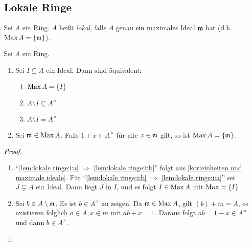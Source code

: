 \documentclass[12pt,a4paper]{scrartcl}
\theoremstyle{cplain}
\theoremstyle{cdef}
\begin{document}
\subsection{Lokale Ringe}
\begin{defi} \label{def1.5}
	Sei $A$ ein Ring. $A$ heißt \emph{lokal}, falls $A$ genau ein maximales Ideal $\mathfrak{m}$ hat (d.h. $\operatorname{Max} A = \{\mathfrak{m}\}$).
\end{defi}
\begin{lem} \label{lem:lokale ringe}
	Sei $A$ ein Ring.
	\begin{enumerate}
		\item \label{lem:lokale ringe:i} Sei $I \subsetneq A$ ein Ideal. Dann sind äquivalent:
		      \begin{enumerate}
			      \item $\operatorname{Max} A = \{I\}$ \label{lem:lokale ringe:i:a}
			      \item $A \setminus I \subseteq A^{\times}$ \label{lem:lokale ringe:i:b}
			      \item $A \setminus I = A^{\times}$ \label{lem:lokale ringe:i:c}
		      \end{enumerate}
		\item \label{lem:lokale ringe:ii} Sei $\mathfrak{m} \in \operatorname{Max} A$. Falls $1+x \in A^{\times}$ für alle $x \in \mathfrak{m}$ gilt, so ist $\operatorname{Max} A=\{ \mathfrak{m} \}$.
	\end{enumerate}
    \begin{proof}
        \leavevmode
		\begin{enumerate}[label=\ref{lem:lokale ringe:\roman*}]
			\item \enquote{\ref{lem:lokale ringe:i:a} $\Rightarrow$ \ref{lem:lokale ringe:i:b}} folgt aus \cref{kor:einheiten und maximale ideale}. Für \enquote{\ref{lem:lokale ringe:i:b} $\Rightarrow$ \ref{lem:lokale ringe:i:a}} sei $J \subsetneq A$ ein Ideal. Dann liegt $J$ in $I$, und es folgt $I \in \operatorname{Max} A$ mit $\operatorname{Max} = \{I\}$.
			\item Sei $b \in A \setminus \mathfrak{m}$. Es ist $b \in A^{\times}$ zu zeigen. Da $\mathfrak{m} \in \operatorname{Max} A$, gilt $(b)+m=A$, es existieren folglich $a \in A, x\in m$ mit $ab+x=1$. Daraus folgt $ab=1-x \in A^{\times}$ und dann $b \in A^{\times}$.
            \qedhere
        \end{enumerate}
	\end{proof}
\end{lem}
\end{document}
